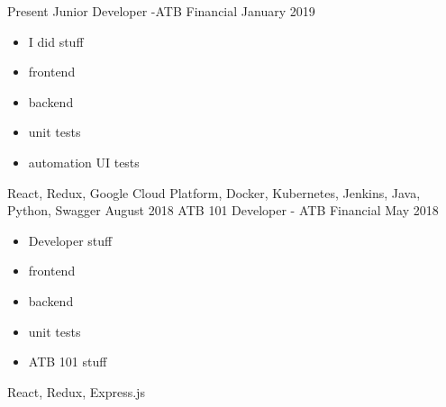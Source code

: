 %
%
%

\begin{experiences}
  \experience
    {Present}   
    {Junior Developer -}{ATB Financial}{}
    {January 2019} {
                      \begin{itemize}
                        \item I did stuff
                        \item frontend
                        \item backend
                        \item unit tests
                        \item automation UI tests
                      \end{itemize}
                  }
                  {React,
                    Redux,
                    Google Cloud Platform,
                    Docker,
                    Kubernetes,
                    Jenkins,
                    Java,
                    Python,
                    Swagger
                  }
  \emptySeparator
  \experience
    {August 2018} {ATB 101 Developer -} {ATB Financial} {}
    {May 2018} {
                \begin{itemize}
                  \item Developer stuff
                  \item frontend
                  \item backend
                  \item unit tests
                  \item ATB 101 stuff                                                              
                \end{itemize}
                }
                {
                  React,
                  Redux,
                  Express.js
                }
  
\end{experiences}
